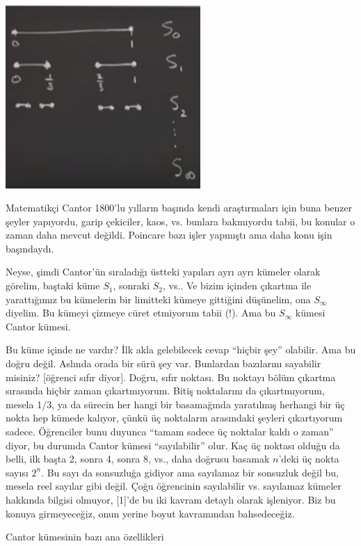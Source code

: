 \documentclass[12pt,fleqn]{article}\usepackage{../../common}
\begin{document}
\includegraphics[width=20em]{23_28.png}

Matematikçi Cantor 1800'lu yılların başında kendi araştırmaları için buna benzer
şeyler yapıyordu, garip çekiciler, kaos, vs. bunlara bakmıyordu tabii, bu
konular o zaman daha mevcut değildi. Poincare bazı işler yapmıştı ama daha konu
işin başındaydı.

Neyse, şimdi Cantor'ün sıraladığı üstteki yapıları ayrı ayrı kümeler olarak
görelim, baştaki küme $S_1$, sonraki $S_2$, vs.. Ve bizim içinden çıkartma ile
yarattığımız bu kümelerin bir limitteki kümeye gittiğini düşünelim, ona
$S_\infty$ diyelim. Bu kümeyi çizmeye cüret etmiyorum tabii (!). Ama bu
$S_\infty$ kümesi Cantor kümesi.

Bu küme içinde ne vardır? İlk akla gelebilecek cevap ``hiçbir şey''
olabilir. Ama bu doğru değil. Aslında orada bir sürü şey var. Bunlardan
bazılarını sayabilir misiniz? [öğrenci sıfır diyor]. Doğru, sıfır noktası. Bu
noktayı bölüm çıkartma sırasında hiçbir zaman çıkartmıyorum. Bitiş noktalarını
da çıkartmıyorum, mesela 1/3, ya da sürecin her hangi bir basamağında yaratılmış
herhangi bir üç nokta hep kümede kalıyor, çünkü üç noktaların arasındaki şeyleri
çıkartıyorum sadece. Öğrenciler bunu duyunca ``tamam sadece üç noktalar kaldı o
zaman'' diyor, bu durumda Cantor kümesi ``sayılabilir'' olur. Kaç üç noktası
olduğu da belli, ilk başta 2, sonra 4, sonra 8, vs., daha doğrusu basamak
$n$'deki üç nokta sayısı $2^n$. Bu sayı da sonsuzluğa gidiyor ama sayılamaz bir
sonsuzluk değil bu, mesela reel sayılar gibi değil. Çoğu öğrencinin sayılabilir
vs. sayılamaz kümeler hakkında bilgisi olmuyor, [1]'de bu iki kavram detaylı
olarak işleniyor. Biz bu konuya girmeyeceğiz, onun yerine boyut kavramından
bahsedeceğiz. 

Cantor kümesinin bazı ana özellikleri
\end{document}
